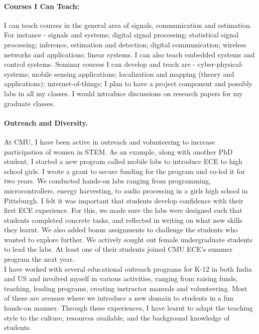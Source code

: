 \documentclass[10pt]{article}
\begin{document}
\paragraph{Courses I Can Teach:}
I can teach courses in the general area of signals, communication and estimation. For instance - signals and systems;  digital signal processing; statistical signal processing; inference, estimation and detection; digital communication; wireless networks and applications; linear systems. I can also teach embedded systems and control systems. 
Seminar courses I can develop and teach are - cyber-physical-systems; mobile sensing applications; localization and mapping (theory and applications); internet-of-things; 
I plan to have a project component and possibly labs in all my classes. I would introduce discussions on research papers for my graduate classes.



 \paragraph{Outreach and Diversity.} 
 At CMU, I have been active in outreach and volunteering to increase participation of women in STEM. %
As an example, along with another PhD student, I started a new program called mobile labs to introduce ECE to high school girls. I wrote a grant to secure funding for the program and co-led it for two years. We conducted hands-on labs ranging from programming, microcontrollers, energy harvesting, to audio processing in a girls high school in Pittsburgh. I felt it was important that students develop confidence with their first ECE experience. For this, we made sure the labs were designed such that students completed concrete tasks, and reflected in writing on what new skills they learnt. We also added bonus assignments to challenge the students who wanted to explore further. We actively sought out female undergraduate students to lead the labs. At least one of their students joined CMU ECE's summer program the next year. \\

I have worked with several educational outreach programs for K-12 in both India and US and involved myself in various activities, ranging from raising funds, teaching, leading programs, creating instructor manuals and volunteering. Most of these are avenues where we introduce a new domain to students in a fun hands-on manner. Through these experiences, I have learnt to adapt the teaching style to the culture, resources available, and the background knowledge of students. \\
\end{document}
